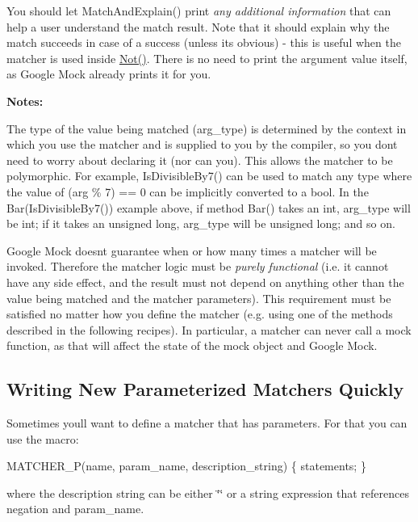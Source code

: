 You should let {\ttfamily Match\+And\+Explain()} print {\itshape any additional information} that can help a user understand the match result. Note that it should explain why the match succeeds in case of a success (unless it\textquotesingle{}s obvious) -\/ this is useful when the matcher is used inside {\ttfamily \hyperlink{namespacetesting_a3d7d0dda7e51b13fe2f5aa28e23ed6b6}{Not()}}. There is no need to print the argument value itself, as Google Mock already prints it for you.

{\bfseries Notes\+:}


\begin{DoxyEnumerate}
\item The type of the value being matched ({\ttfamily arg\+\_\+type}) is determined by the context in which you use the matcher and is supplied to you by the compiler, so you don\textquotesingle{}t need to worry about declaring it (nor can you). This allows the matcher to be polymorphic. For example, {\ttfamily Is\+Divisible\+By7()} can be used to match any type where the value of {\ttfamily (arg \% 7) == 0} can be implicitly converted to a {\ttfamily bool}. In the {\ttfamily Bar(\+Is\+Divisible\+By7())} example above, if method {\ttfamily Bar()} takes an {\ttfamily int}, {\ttfamily arg\+\_\+type} will be {\ttfamily int}; if it takes an {\ttfamily unsigned long}, {\ttfamily arg\+\_\+type} will be {\ttfamily unsigned long}; and so on.
\end{DoxyEnumerate}
\begin{DoxyEnumerate}
\item Google Mock doesn\textquotesingle{}t guarantee when or how many times a matcher will be invoked. Therefore the matcher logic must be {\itshape purely functional} (i.\+e. it cannot have any side effect, and the result must not depend on anything other than the value being matched and the matcher parameters). This requirement must be satisfied no matter how you define the matcher (e.\+g. using one of the methods described in the following recipes). In particular, a matcher can never call a mock function, as that will affect the state of the mock object and Google Mock.
\end{DoxyEnumerate}

\subsection*{Writing New Parameterized Matchers Quickly}

Sometimes you\textquotesingle{}ll want to define a matcher that has parameters. For that you can use the macro\+: 
\begin{DoxyCode}
MATCHER\_P(name, param\_name, description\_string) \{ statements; \}
\end{DoxyCode}
 where the description string can be either {\ttfamily \char`\"{}\char`\"{}} or a string expression that references {\ttfamily negation} and {\ttfamily param\+\_\+name}.


